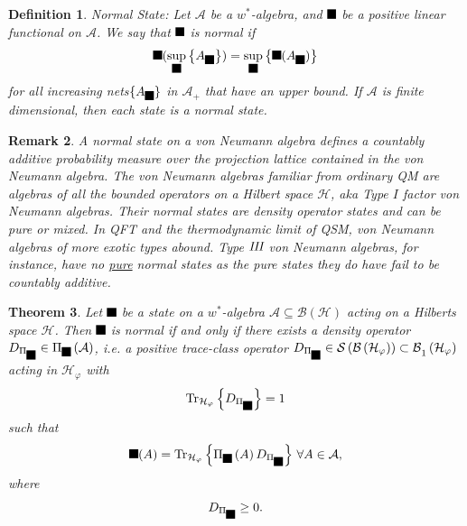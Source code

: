 \documentclass[aps,preprint]{revtex4}%
\providecommand{\U}[1]{\protect\rule{.1in}{.1in}}
\newtheorem{theorem}{Theorem}
\newtheorem{definition}[theorem]{Definition}
\newtheorem{remark}[theorem]{Remark}
\begin{document}
\begin{definition}
Normal State: Let $\mathcal{A}$ be a $w^{\ast}$-algebra, and $\U{3c6} $ be a
positive linear functional on $\mathcal{A}$. We say that $\U{3c6} $ is
\emph{normal} if
\begin{equation}
\U{3c6} (\sup\limits_{\U{3b1} }\left\{  A_{\U{3b1} }\right\}  )=\sup
\limits_{\U{3b1} }\left\{  \U{3c6} (A_{\U{3b1} })\right\}
\end{equation}
for all \emph{increasing nets}$\{A_{\U{3b1} }\}$ in $\mathcal{A}_{+}$ that
have an upper bound. If $\mathcal{A}$ is finite dimensional, then each state
is a normal state.
\end{definition}

\begin{remark}
A \emph{normal state} on a von Neumann algebra defines a \emph{countably
additive probability measure} over the \emph{projection lattice contained in
the }von Neumann algebra. The von Neumann algebras familiar from ordinary QM
are algebras of all the bounded operators on a Hilbert space $\mathcal{H}$,
aka Type $I$ factor von Neumann algebras. Their normal states are density
operator states and can be pure or mixed. In QFT and the thermodynamic limit
of QSM, von Neumann algebras of more exotic types abound. \emph{Type
}$\emph{III}$\emph{ von Neumann algebras, for instance, have no
\underline{\emph{pure}} normal states} as the pure states they do have
\emph{fail to be} countably additive.
\end{remark}

\begin{theorem}
Let $\U{3c6} $ be a state on a $w^{\ast}$-algebra $\mathcal{A\subseteq
B}\left(  \mathcal{H}\right)  $ acting on a Hilberts space $\mathcal{H}$. Then
$\U{3c6} $ is normal \emph{if and only if} there exists a density operator
$D_{\Pi_{\U{3c6} }}\in\Pi_{\U{3c6} }\left(  \mathcal{A}\right)  $, i.e. a
\emph{positive trace-class operator }$D_{\Pi_{\U{3c6} }}\in\mathcal{S\left(
\mathcal{B}\left(  \mathcal{H}_{\varphi}\right)  \right)  \subset B}%
_{1}\left(  \mathcal{H}_{\varphi}\right)  $ acting in $\mathcal{H}_{\varphi}$
with
\begin{equation}
\operatorname{Tr}_{\mathcal{H}_{\varphi}}\left\{  D_{\Pi_{\U{3c6} }}\right\}
=1
\end{equation}
such that
\begin{equation}
\U{3c6} (A)=\operatorname{Tr}_{\mathcal{H}_{\varphi}}\left\{  \Pi_{\U{3c6}
}\left(  A\right)  D_{\Pi_{\U{3c6} }}\right\}  \,\forall A\in\mathcal{A},
\end{equation}
where
\begin{equation}
D_{\Pi_{\U{3c6} }}\geq0.
\end{equation}

\end{theorem}
\end{document}
